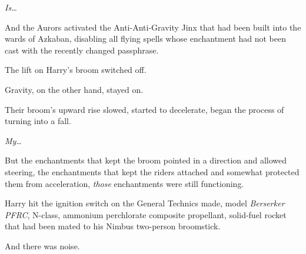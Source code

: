 \emph{Is…}

And the Aurors activated the Anti-Anti-Gravity Jinx that had been built into the wards of Azkaban, disabling all flying spells whose enchantment had not been cast with the recently changed passphrase.

The lift on Harry’s broom switched off.

Gravity, on the other hand, stayed on.

Their broom’s upward rise slowed, started to decelerate, began the process of turning into a fall.

\emph{My…}

But the enchantments that kept the broom pointed in a direction and allowed steering, the enchantments that kept the riders attached and somewhat protected them from acceleration, \emph{those} enchantments were still functioning.

\emph{}

Harry hit the ignition switch on the General Technics made, model \emph{Berserker PFRC}, N-class, ammonium perchlorate composite propellant, solid-fuel rocket that had been mated to his Nimbus  two-person broomstick.

And there was noise.

